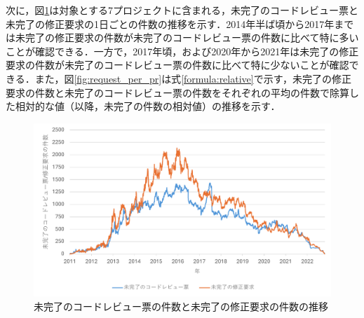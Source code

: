 \documentclass[11pt]{jreport}
\begin{document}
\begin{table}[t]
\centering
  \caption{1日ごとの未完了のコードレビュー票の件数と未完了の修正要求の件数の分布の差異}
  \label{table:mann_whitney}
\end{table}

次に，図\ref{fig:task_transition}は対象とする7プロジェクトに含まれる，未完了のコードレビュー票と未完了の修正要求の1日ごとの件数の推移を示す．2014年半ば頃から2017年までは未完了の修正要求の件数が未完了のコードレビュー票の件数に比べて特に多いことが確認できる．一方で，2017年頃，および2020年から2021年は未完了の修正要求の件数が未完了のコードレビュー票の件数に比べて特に少ないことが確認できる．また，図\ref{fig:request_per_pr}は式\ref{formula:relative}で示す，未完了の修正要求の件数と未完了のコードレビュー票の件数をそれぞれの平均の件数で除算した相対的な値（以降，未完了の件数の相対値）の推移を示す．

\begin{figure}[t]
\centerline{\includegraphics[width=1.0\linewidth]{@BSthesis2024_Kawasaki/BSthesis2024_Kawasaki_fig/task_transition.pdf}}
\caption{未完了のコードレビュー票の件数と未完了の修正要求の件数の推移}
\label{fig:task_transition}
\end{figure}
\end{document}
